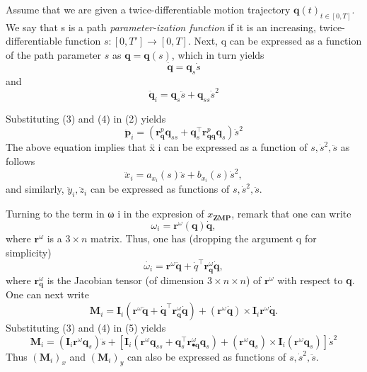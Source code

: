 \documentclass[journal]{IEEEtran}
\begin{document}
Assume that we are given a twice-differentiable motion
trajectory $\textbf{q}(t)_{t\in[0,T]}$. We say that s is a path \emph{parameter-ization function} if it is an increasing, twice-differentiable function $s : [0, T'] → [0, T ]$. Next, q can be expressed as a
function of the path parameter $s$ as $\textbf{q} = \textbf{q}(s)$, which in turn yields
\begin{equation}
\dot{\textbf{q}}=\textbf{q}_{s}\dot{s}
\end{equation}
and
\begin{equation}
\ddot{\textbf{q}}_{i}=\textbf{q}_{s}\ddot{s}+\textbf{q}_{ss}\dot{s}^{2}
\end{equation}

Substituting (3) and (4) in (2) yields
$$
\ddot{\textbf{p}}_{i}=(\textbf{r}^{p}_{\textbf{q}}\textbf{q}_{ss}+\textbf{q}^{\top}_{s}\textbf{r}^{p}_{\textbf{qq}}\textbf{q}_{s})\dot{s}^{2}
$$
The above equation implies that ẍ i can be expressed as a
function of $s,\dot{s}^{2},\ddot{s}$ as follows
$$
\ddot{x}_{i}=a_{x_{i}}(s)\ddot{s}+b_{x_{i}}(s)\dot{s}^{2},
$$
and similarly, $\ddot{y}_{i},\ddot{z}_{i}$ can be expressed as functions of $s,\dot{s}^{2},\ddot{s}$.

Turning to the term in ω i in the expresion of $x_{\textbf{ZMP}}$, remark that one can write
$$
\omega_{i}=\textbf{r}^{\omega}(\textbf{q})\dot{\textbf{q}},
$$
where $\textbf{r}^{\omega}$ is a $3 \times n$ matrix. Thus, one has (dropping the argument q for simplicity)
$$
\dot{\omega_{i}}=\textbf{r}^{\omega}\ddot{\textbf{q}}+\dot{q}^{\top}\textbf{r}^{\omega}_{\textbf{q}}\dot{\textbf{q}},
$$
where $\textbf{r}^{\omega}_{\textbf{q}}$ is the Jacobian tensor (of dimension $3 \times n\times n$) of $\textbf{r}^{\omega}$ with respect to \textbf{q}. One can next write
\begin{equation}
\textbf{M}_{i}=\textbf{I}_{i}(\textbf{r}^{\omega}\ddot{\textbf{q}}+\dot{\textbf{q}}^{\top}\textbf{r}^{\omega}_{\textbf{q}}\dot{\textbf{q}})+(\textbf{r}^{\omega}\dot{\textbf{q}})\times \textbf{I}_{i}\textbf{r}^{\omega}\dot{\textbf{q}}.
\end{equation}
Substituting (3) and (4) in (5) yields
$$
\textbf{M}_{i}=(\textbf{I}_{i}\textbf{r}^{\omega}\textbf{q}_{s})\ddot{s}+[\textbf{I}_{i}(\textbf{r}^{\omega}\textbf{q}_{ss}+\textbf{q}^{\top}_{s}\textbf{r}^{\omega}_{\textbf{•q}}\textbf{q}_{s})+(\textbf{r}^{\omega}\textbf{q}_{s})\times \textbf{I}_{i}(\textbf{r}^{\omega}\textbf{q}_{s})]\dot{s}^{2}
$$
Thus $(\textbf{M}_{i})_{x}$ and $(\textbf{M}_{i})_{y}$ can also be expressed as functions of $s,\dot{s}^{2},\ddot{s}$.
\end{document}
